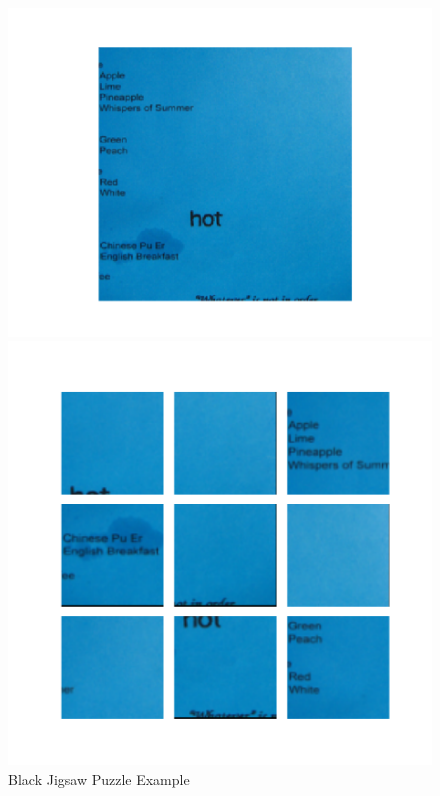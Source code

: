 \documentclass{article}
\begin{document}
\begin{figure}
\begin{minipage}{\textwidth}
\begin{minipage}{.49\textwidth}
\begin{minipage}{.49\textwidth}
            \end{minipage}
            \caption{Black Jigsaw Puzzle Example}
            \label{fig:blackjigsawpuzzle}
        \end{minipage}
    \end{minipage}
    \begin{minipage}{\textwidth}
        \begin{minipage}{.49\textwidth}
            \begin{minipage}{.49\textwidth}
                \centering
                \includegraphics[width=\textwidth]{origin_blue}
            \end{minipage}
            \begin{minipage}{.49\textwidth}
                \centering
                \includegraphics[width=\textwidth]{puzzle_blue}

\end{minipage}
\end{minipage}
\end{minipage}
\end{figure}
\end{document}
